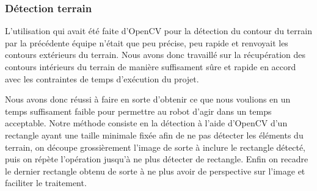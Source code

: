 \subsubsection{Détection terrain}
\label{subs:Détection terrain}
\par L'utilisation qui avait été faite d'OpenCV pour la détection du contour du
terrain par la précédente équipe n'était que
peu précise, peu rapide et renvoyait les contours extérieurs du terrain. Nous avons donc
travaillé sur la récupération des contours intérieurs du terrain de manière
suffisament sûre et rapide en accord avec les contraintes de temps d'exécution du projet.
\par Nous avons donc réussi à faire en sorte d'obtenir ce que nous voulions en
un temps suffisament faible pour permettre au robot d'agir dans un temps
acceptable. Notre méthode consiste en la détection à l'aide d'OpenCV d'un
rectangle ayant une taille minimale fixée afin de ne pas détecter les éléments
du terrain, on découpe grossièrement l'image de sorte à inclure le rectangle
détecté, puis on répète l'opération jusqu'à ne plus détecter de rectangle. Enfin
on recadre le dernier rectangle obtenu de sorte à ne plus avoir de
perspective sur l'image et faciliter le traitement.

